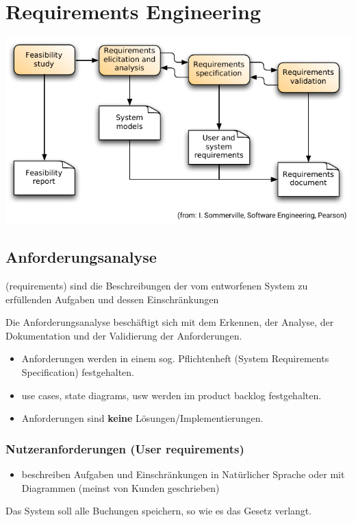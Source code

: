 \documentclass[
    ngerman,
    color=3b,
    summary,
    boxarc,
    main,
]{rubos-tuda-template}
\begin{document}
\section{Requirements Engineering}
\includegraphics{bilder/Requirements engineering Process Flow.pdf}
{\centering
    \subsection{Anforderungsanalyse}
}
\begin{definition}[Anforderungen]
    (requirements) sind die Beschreibungen der vom entworfenen System zu erfüllenden Aufgaben und dessen Einschränkungen
\end{definition}
Die Anforderungsanalyse beschäftigt sich mit dem Erkennen, der Analyse, der Dokumentation und der Validierung der Anforderungen.
\begin{itemize}
    \item Anforderungen werden in einem sog. Pflichtenheft (System Requirements Specification) festgehalten.
    \item use cases, state diagrams, usw werden im product backlog festgehalten.
    \item Anforderungen sind \textbf{keine} Lösungen/Implementierungen.
\end{itemize}
\subsubsection{Nutzeranforderungen (User requirements)}
\begin{itemize}
    \item beschreiben Aufgaben und Einschränkungen in Natürlicher Sprache oder mit Diagrammen (meinst von Kunden geschrieben)
\end{itemize}
 Das System soll alle Buchungen speichern, so wie es das Gesetz verlangt.
\end{document}
